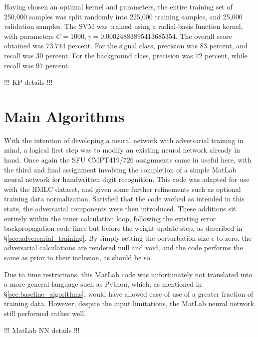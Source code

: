 \documentclass{article} %
\begin{document}
Having chosen an optimal kernel and parameters, the entire training set of 250,000 samples was split randomly into 225,000 training samples, and 25,000 validation samples. The SVM was trained using a radial-basis function kernel, with parameters $C=1000,\gamma=0.00024883895413685354$. The overall score obtained was $73.744$ percent. For the signal class, precision was $83$ percent, and recall was $30$ percent. For the background class, precision was $72$ percent, while recall was $97$ percent.



!!! KP details !!!


\section{Main Algorithms}
\label{sec:main_algorithms}

With the intention of developing a neural network with adversarial training in mind, a logical first step was to modify an existing neural network already in hand. Once again the SFU CMPT419/726 assignments came in useful here, with the third and final assignment involving the completion of a simple MatLab neural network for handwritten digit recognition. This code was adapted for use with the HMLC dataset, and given some further refinements such as optional training data normalization. Satisfied that the code worked as intended in this state, the adversarial components were then introduced. These additions sit entirely within the inner calculation loop, following the existing error backpropagation code lines but before the weight update step, as described in \S\ref{sec:adversarial_training}. By simply setting the perturbation size $\epsilon$ to zero, the adversarial calculations are rendered null and void, and the code performs the same as prior to their inclusion, as should be so.

Due to time restrictions, this MatLab code was unfortunately not translated into a more general language such as Python, which, as mentioned in \S\ref{sec:baseline_algorithms}, would have allowed ease of use of a greater fraction of training data. However, despite the input limitations, the MatLab neural network still performed rather well.

!!! MatLab NN details !!!
\end{document}
